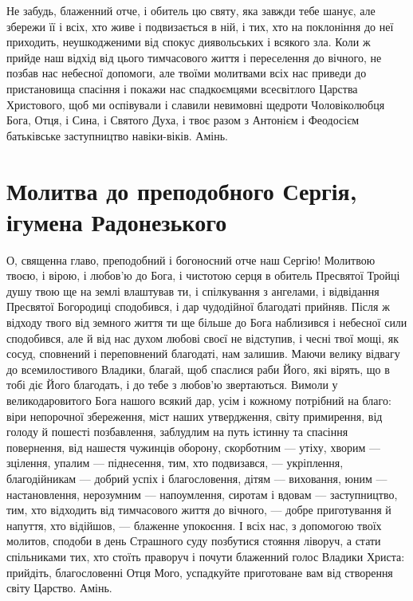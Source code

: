 \documentclass[chapters.tex]{subfiles}
\begin{document}
Не забудь, блаженний отче, і обитель цю святу, яка завжди тебе шанує, але збережи її і всіх, хто живе і подвизається в ній, і тих, хто на поклоніння до неї приходить, неушкодженими від спокус диявольських і всякого зла. Коли ж прийде наш відхід від цього тимчасового життя і переселення до вічного, не позбав нас небесної допомоги, але твоїми молитвами всіх нас приведи до пристановища спасіння і покажи нас спадкоємцями всесвітлого Царства Христового, щоб ми оспівували і славили невимовні щедроти Чоловіколюбця Бога, Отця, і Сина, і Святого Духа, і твоє разом з Антонієм і Феодосієм батьківське заступництво навіки-віків. Амінь.

\section{Молитва до преподобного Сергія, ігумена Радонезького}
О, священна главо, преподобний і богоносний отче наш Сергію! Молитвою твоєю, і вірою, і любов’ю до Бога, і чистотою серця в обитель Пресвятої Тройці душу твою ще на землі влаштував ти, і спілкування з ангелами, і відвідання Пресвятої Богородиці сподобився, і дар чудодійної благодаті прийняв. Після ж відходу твого від земного життя ти ще більше до Бога наблизився і небесної сили сподобився, але й від нас духом любові своєї не відступив, і чесні твої мощі, як сосуд, сповнений і переповнений благодаті, нам залишив. Маючи велику відвагу до всемилостивого Владики, благай, щоб спаслися раби Його, які вірять, що в тобі діє Його благодать, і до тебе з любов’ю звертаються. Вимоли у великодаровитого Бога нашого всякий дар, усім і кожному потрібний на благо: віри непорочної збереження, міст наших утвердження, світу примирення, від голоду й пошесті позбавлення, заблудлим на путь істинну та спасіння повернення, від нашестя чужинців оборону, скорботним — утіху, хворим — зцілення, упалим — піднесення, тим, хто подвизався, — укріплення, благодійникам — добрий успіх і благословення, дітям — виховання, юним — настановлення, нерозумним — напоумлення, сиротам і вдовам — заступництво, тим, хто відходить від тимчасового життя до вічного, — добре приготування й напуття, хто відійшов, — блаженне упокоєння. І всіх нас, з допомогою твоїх молитов, сподоби в день Страшного суду позбутися стояння ліворуч, а стати спільниками тих, хто стоїть праворуч і почути блаженний голос Владики Христа: прийдіть, благословенні Отця Мого, успадкуйте приготоване вам від створення світу Царство. Амінь.
\end{document}

